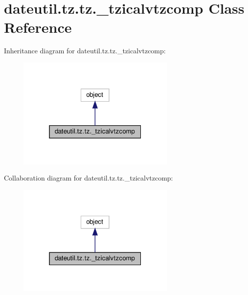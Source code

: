 \hypertarget{classdateutil_1_1tz_1_1tz_1_1__tzicalvtzcomp}{}\section{dateutil.\+tz.\+tz.\+\_\+tzicalvtzcomp Class Reference}
\label{classdateutil_1_1tz_1_1tz_1_1__tzicalvtzcomp}


Inheritance diagram for dateutil.\+tz.\+tz.\+\_\+tzicalvtzcomp\+:
\nopagebreak
\begin{figure}[H]
\begin{center}
\leavevmode
\includegraphics[width=220pt]{classdateutil_1_1tz_1_1tz_1_1__tzicalvtzcomp__inherit__graph}
\end{center}
\end{figure}


Collaboration diagram for dateutil.\+tz.\+tz.\+\_\+tzicalvtzcomp\+:
\nopagebreak
\begin{figure}[H]
\begin{center}
\leavevmode
\includegraphics[width=220pt]{classdateutil_1_1tz_1_1tz_1_1__tzicalvtzcomp__coll__graph}
\end{center}
\end{figure}
